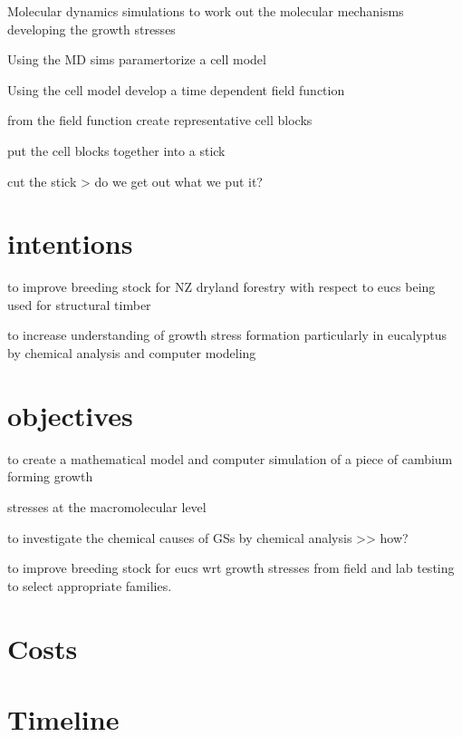 \documentclass{article}
\begin{document}
Molecular dynamics simulations to work out the molecular mechanisms developing the growth stresses

Using the MD sims paramertorize a cell model

Using the cell model develop a time dependent field function

from the field function create representative cell blocks

put the cell blocks together into a stick

cut the stick > do we get out what we put it?

\section{intentions}
to improve breeding stock for NZ dryland forestry with respect to eucs being used for structural timber

to increase understanding of growth stress formation particularly in eucalyptus
by chemical analysis and computer modeling

\section{objectives}

to create a mathematical model and computer simulation of a piece of cambium forming growth

stresses at the macromolecular level

to investigate the chemical causes of GSs by chemical analysis >> how?

to improve breeding stock for eucs wrt growth stresses from field and lab testing to select appropriate families.

\section{Costs}

\section{Timeline}
\end{document}
